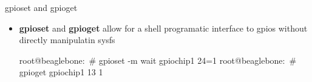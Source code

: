 \begin{frame}
   {gpioset and gpioget}
   \begin{itemize}
      \item \textbf{gpioset} and \textbf{gpioget} allow for a shell programatic 
	      interface to gpios without directly manipulatin sysfs
      \begin{raw}
root@beaglebone:~# gpioset -m wait gpiochip1 24=1
root@beaglebone:~# gpioget gpiochip1 13
1
      \end{raw}
   \end{itemize}
\end{frame}

\cprotect\note{


}

